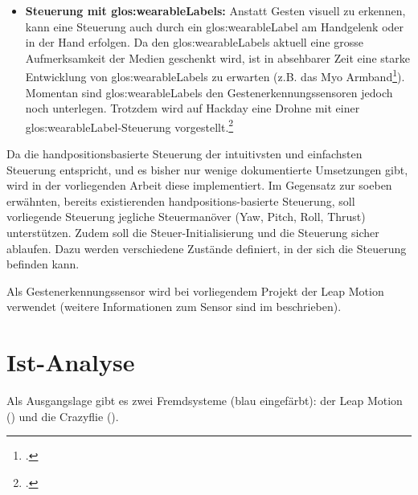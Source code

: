 \begin{itemize}
	\item \textbf{Steuerung mit \glspl{glos:wearableLabel}:}
	Anstatt Gesten visuell zu erkennen, kann eine Steuerung auch durch ein \gls{glos:wearableLabel} am Handgelenk oder in der Hand erfolgen.
	Da den \glspl{glos:wearableLabel} aktuell eine grosse Aufmerksamkeit der Medien geschenkt wird, ist in absehbarer Zeit eine starke Entwicklung von \glspl{glos:wearableLabel} zu erwarten (z.B. das Myo Armband\footcite{Myo_Gesture_Control_Armband_-_Wearable_Technology_by_Thalmic_Labs_2015-08-28}).
	Momentan sind \glspl{glos:wearableLabel} den Gestenerkennungssensoren jedoch noch unterlegen.
	Trotzdem wird auf Hackday eine Drohne mit einer \gls{glos:wearableLabel}-Steuerung vorgestellt.\footcite{Wearable_Gesture_Controlled_Drone_Hackaday_2015-04-29}
\end{itemize}

Da die handpositionsbasierte Steuerung der intuitivsten und einfachsten Steuerung entspricht, und es bisher nur wenige dokumentierte  Umsetzungen gibt, wird in der vorliegenden Arbeit diese implementiert.
Im Gegensatz zur soeben erwähnten, bereits existierenden handpositions-basierte Steuerung, soll vorliegende Steuerung jegliche Steuermanöver (Yaw, Pitch, Roll, Thrust) unterstützen.
Zudem soll die Steuer-Initialisierung und die Steuerung sicher ablaufen. Dazu werden verschiedene Zustände definiert, in der sich die Steuerung befinden kann.

Als Gestenerkennungssensor wird bei vorliegendem Projekt der Leap Motion verwendet (weitere Informationen zum Sensor sind im  beschrieben).



\clearpage %
\section{Ist-Analyse}

Als Ausgangslage gibt es zwei Fremdsysteme (blau eingefärbt): der Leap Motion () und die Crazyflie ().


